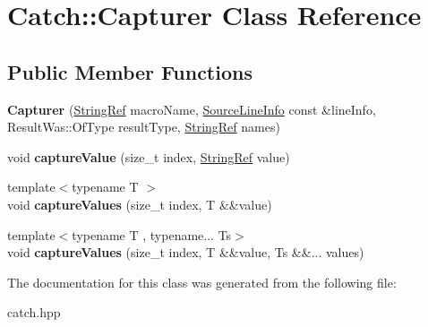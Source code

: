\hypertarget{class_catch_1_1_capturer}{}\section{Catch\+:\+:Capturer Class Reference}
\label{class_catch_1_1_capturer}
\subsection*{Public Member Functions}
\begin{DoxyCompactItemize}
\item 
\mbox{\label{class_catch_1_1_capturer_a86b0b27acc803a4e1310c10820f3038f}} 
{\bfseries Capturer} (\mbox{\hyperlink{class_catch_1_1_string_ref}{String\+Ref}} macro\+Name, \mbox{\hyperlink{struct_catch_1_1_source_line_info}{Source\+Line\+Info}} const \&line\+Info, Result\+Was\+::\+Of\+Type result\+Type, \mbox{\hyperlink{class_catch_1_1_string_ref}{String\+Ref}} names)
\item 
\mbox{\label{class_catch_1_1_capturer_a45e14b9667dc9df7f5132507b322934c}} 
void {\bfseries capture\+Value} (size\+\_\+t index, \mbox{\hyperlink{class_catch_1_1_string_ref}{String\+Ref}} value)
\item 
\mbox{\label{class_catch_1_1_capturer_af0810e7f79b197648434d81b492a8c2b}} 
{\footnotesize template$<$typename T $>$ }\\void {\bfseries capture\+Values} (size\+\_\+t index, T \&\&value)
\item 
\mbox{\label{class_catch_1_1_capturer_a152c9083bfed800786673327b9c522ce}} 
{\footnotesize template$<$typename T , typename... Ts$>$ }\\void {\bfseries capture\+Values} (size\+\_\+t index, T \&\&value, Ts \&\&... values)
\end{DoxyCompactItemize}


The documentation for this class was generated from the following file\+:\begin{DoxyCompactItemize}
\item 
catch.\+hpp\end{DoxyCompactItemize}
